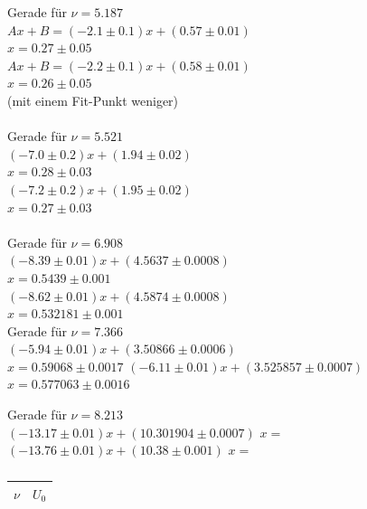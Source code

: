 \documentclass[12pt]{article}
\begin{document}
Gerade für $\nu=5.187$\\
$Ax+B=(-2.1 \pm 0.1)x+(0.57 \pm 0.01)$\\
$x=0.27 \pm 0.05$\\ %
$Ax+B=(-2.2 \pm 0.1)x+(0.58 \pm 0.01)$\\
$x=0.26 \pm 0.05$\\
(mit einem Fit-Punkt weniger)\\
\\
Gerade für $\nu=5.521$\\
$(-7.0 \pm 0.2)x + (1.94 \pm 0.02)$\\
$x=0.28 \pm 0.03$\\ %
$(-7.2 \pm 0.2)x + (1.95 \pm 0.02)$\\
$x=0.27 \pm 0.03$\\ %
\\
Gerade für $\nu=6.908$\\
$(-8.39 \pm 0.01)x + (4.5637 \pm 0.0008)$\\
$x=0.5439 \pm 0.001$\\
$(-8.62 \pm 0.01)x + (4.5874 \pm 0.0008)$\\
$x=0.532181 \pm 0.001$\\

Gerade für $\nu=7.366$\\
$(-5.94 \pm 0.01)x + (3.50866 \pm 0.0006)$\\
$x=0.59068 \pm 0.0017$
$(-6.11 \pm 0.01)x + (3.525857 \pm 0.0007)$\\
$x=0.577063 \pm 0.0016$

Gerade für $\nu=8.213$\\
$(-13.17 \pm 0.01)x + (10.301904 \pm 0.0007)$
$x=$
$(-13.76 \pm 0.01)x + (10.38 \pm 0.001)$
$x=$



\begin{table}[H]
\begin{center}
\begin{tabular}{|c|c|}
\hline
$\nu$ & $U_0$\\
\hline

\hline
\end{tabular}
\caption{}
\end{center}
\end{table}
\end{document}
